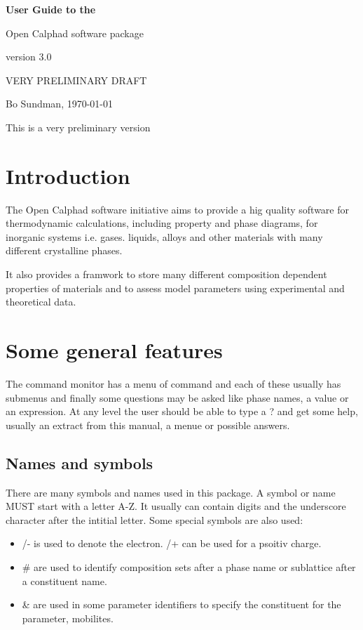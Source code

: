 \documentclass[12pt]{article}
\begin{document}
\begin{center}

{\Huge \bf User Guide to the 

Open Calphad software package

version 3.0

}

\bigskip

VERY PRELIMINARY DRAFT

Bo Sundman, \today

\end{center}

This is a very preliminary version

\section{Introduction}

The Open Calphad software initiative aims to provide a hig quality
software for thermodynamic calculations, including property and phase
diagrams, for inorganic systems i.e.  gases. liquids, alloys and other
materials with many different crystalline phases.

It also provides a framwork to store many different composition
dependent properties of materials and to assess model parameters using
experimental and theoretical data.

\section{Some general features}

The command monitor has a menu of command and each of these usually
has submenus and finally some questions may be asked like phase names,
a value or an expression.  At any level the user should be able to
type a ? and get some help, usually an extract from this manual, a
menue or possible answers.

\subsection{Names and symbols}

There are many symbols and names used in this package.  A symbol or
name MUST start with a letter A-Z.  It usually can contain digits and
the underscore character after the intitial letter.  Some special
symbols are also used:

\begin{itemize}
\item /- is used to denote the electron. /+ can be used for a psoitiv charge.
\item \# are used to identify composition sets after a phase name or
sublattice after a constituent name.
\item \& are used in some parameter identifiers to specify the
  constituent for the parameter, mobilites.
\end{itemize}
\end{document}
